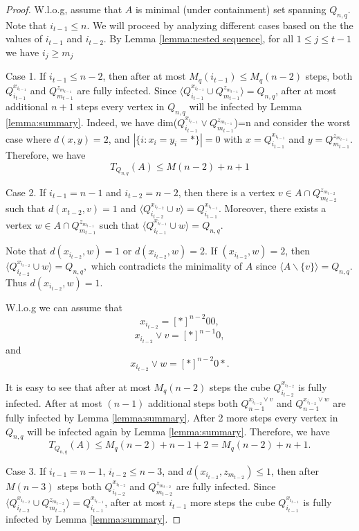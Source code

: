 \documentclass[reqno,11pt]{amsart}
\renewcommand{\leq}{\leqslant}
\renewcommand{\geq}{\geqslant}
\begin{document}
\begin{proof}
W.l.o.g, assume that $A$ is minimal (under containment) set spanning $Q_{n,q}$. Note that $i_{t-1} \leq n$. We will proceed by analyzing different cases based on the the values of $i_{t-1}$ and $i_{t-2}$. By Lemma \ref{lemma:nested sequence}, for all $ 1 \leq j \leq t-1$ we have $i_j \geq m_j$

Case 1. If $i_{t-1} \leq n-2$, then after at most $M_q(i_{t-1}) \leq M_q(n-2)$ steps, both $Q_{i_{t-1}}^{x_{i_{t-1}}}$ and $Q_{m_{t-1}}^{z_{m_{t-1}}}$ are fully infected. Since $\langle Q_{i_{t-1}}^{x_{i_{t-1}}} \cup Q_{m_{t-1}}^{z_{m_{t-1}}} \rangle=Q_{n,q}$, after at most additional $n+1$ steps every vertex in $Q_{n,q}$ will be infected by Lemma \ref{lemma:summary}. Indeed, we have dim($Q_{i_{t-1}}^{x_{i_{t-1}}} \vee Q_{m_{t-1}}^{z_{m_{t-1}}}$)=n and consider the worst case where $d(x,y)=2$, and $|\{i:x_i=y_i=\ast \}|=0$ with $x=Q_{i_{t-1}}^{x_{i_{t-1}}}$ and $y=Q_{m_{t-1}}^{z_{m_{t-1}}}$.
Therefore, we have 
$$T_{Q_{n,q}}(A) \leq M(n-2)+n+1$$

Case 2. If $i_{t-1}=n-1$ and $i_{t-2}=n-2$, then there is a vertex $v \in A\cap Q_{m_{t-2}}^{z_{m_{t-2}}}$ such that $d(x_{t-2},v)=1$ and $\langle Q_{i_{t-2}}^{x_{i_{t-2}}} \cup v \rangle=Q_{i_{t-1}}^{x_{i_{t-1}}}.$ Moreover, there exists a vertex $w \in A \cap Q_{m_{t-1}}^{z_{m_{t-1}}}$ such that $\langle Q_{i_{t-1}}^{x_{i_{t-1}}} \cup w \rangle=Q_{n,q}.$ 

Note that $d(x_{i_{t-2}},w)=1$ or $d(x_{i_{t-2}},w)=2$. If $(x_{i_{t-2}},w)=2$, then $\langle Q_{i_{t-2}}^{x_{i_{t-2}}} \cup w \rangle=Q_{n,q},$ which contradicts the minimality of $A$ since $\langle A \backslash \{v\} \rangle =Q_{n,q}$. Thus $d(x_{i_{t-2}},w)=1$.

W.l.o.g we can assume that
$$x_{i_{t-2}}=[\ast]^{n-2}00,$$
$$x_{i_{t-2}} \vee v=[\ast]^{n-1}0,$$
and 
$$x_{i_{t-2}} \vee w=[\ast]^{n-2}0\ast.$$

It is easy to see that after at most $M_q(n-2)$ steps the cube $Q_{i_{t-2}}^{x_{i_{t-2}}}$ is fully infected. After at most $(n-1)$ additional steps both $Q_{n-1}^{x_{i_{t-2}} \vee v}$ and $Q_{n-1}^{x_{i_{t-2}} \vee w }$ are fully infected by Lemma \ref{lemma:summary}. After 2 more steps every vertex in $Q_{n,q}$ will be infected again by Lemma \ref{lemma:summary}. Therefore, we have
$$T_{Q_{n,q}}(A) \leq M_q(n-2)+n-1+2 =M_q(n-2)+n+1.$$

Case 3. If $i_{t-1}=n-1$, $i_{t-2} \leq n-3$, and $d({x_{i_{t-2}}},z_{m_{t-2}}) \leq 1$, then after $M(n-3)$ steps both $Q_{i_{t-2}}^{x_{i_{t-2}}}$ and $Q_{m_{t-2}}^{z_{m_{t-2}}}$ are fully infected. Since $\langle Q_{i_{t-2}}^{x_{i_{t-2}}} \cup Q_{m_{t-2}}^{z_{m_{t-2}}} \rangle=Q_{i_{t-1}}^{x_{i_{t-1}}}$, after at most $i_{t-1}$ more steps the cube $Q_{i_{t-1}}^{x_{i_{t-1}}}$ is fully infected by Lemma \ref{lemma:summary}. 


\end{proof}
\end{document}
